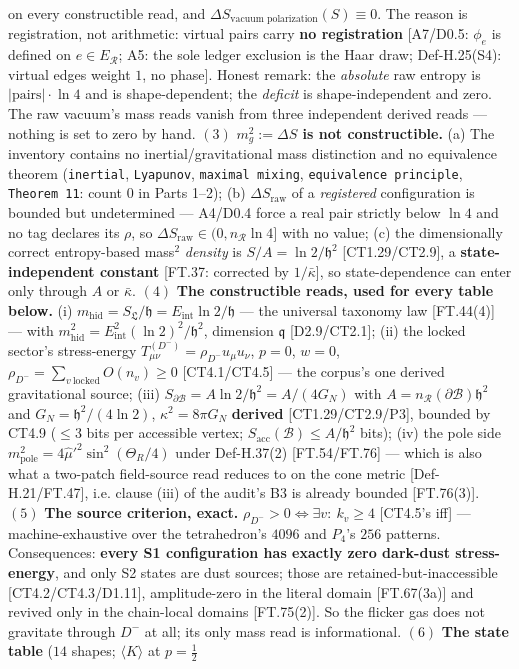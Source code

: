 \begin{theorem}
on every constructible read, and $\Delta S_{\text{vacuum polarization}}(S)\equiv0$. The reason is registration, not arithmetic: virtual pairs carry \textbf{no registration} [A7/D0.5: $\phi_e$ is defined on $e\in E_{\mathcal R}$; A5: the sole ledger exclusion is the Haar draw; Def-H.25(S4): virtual edges weight $1$, no phase]. Honest remark: the \textit{absolute} raw entropy is $|\mathrm{pairs}|\cdot\ln4$ and is shape-dependent; the \textit{deficit} is shape-independent and zero. The raw vacuum's mass reads vanish from three independent derived reads — nothing is set to zero by hand. $(3)$ \textbf{$m_g^2:=\Delta S$ is not constructible.} (a) The inventory contains no inertial/gravitational mass distinction and no equivalence theorem (\texttt{inertial}, \texttt{Lyapunov}, \texttt{maximal\ mixing}, \texttt{equivalence\ principle}, \texttt{Theorem\ 11}: count $0$ in Parts 1–2); (b) $\Delta S_{\mathrm{raw}}$ of a \textit{registered} configuration is bounded but undetermined — A4/D0.4 force a real pair strictly below $\ln4$ and no tag declares its $\rho$, so $\Delta S_{\mathrm{raw}}\in(0,n_{\mathcal R}\ln4]$ with no value; (c) the dimensionally correct entropy-based mass$^2$ \textit{density} is $S/A=\ln2/\mathfrak h^2$ [CT1.29/CT2.9], a \textbf{state-independent constant} [FT.37: corrected by $1/\bar\kappa$], so state-dependence can enter only through $A$ or $\bar\kappa$. $(4)$ \textbf{The constructible reads, used for every table below.} (i) $m_{\mathrm{hid}}=S_{\mathfrak L}/\mathfrak h=E_{\mathrm{int}}\ln2/\mathfrak h$ — the universal taxonomy law [FT.44(4)] — with $m_{\mathrm{hid}}^2=E_{\mathrm{int}}^2(\ln2)^2/\mathfrak h^2$, dimension $\mathfrak q$ [D2.9/CT2.1]; (ii) the locked sector's stress-energy $T^{(D^-)}_{\mu\nu}=\rho_{D^-}u_\mu u_\nu$, $p=0$, $w=0$, $\rho_{D^-}=\sum_{v\ \mathrm{locked}}O(n_v)\ge0$ [CT4.1/CT4.5] — the corpus's one derived gravitational source; (iii) $S_{\partial\mathcal B}=A\ln2/\mathfrak h^2=A/(4G_N)$ with $A=n_{\mathcal R}(\partial\mathcal B)\mathfrak h^2$ and $G_N=\mathfrak h^2/(4\ln2)$, $\kappa^2=8\pi G_N$ \textbf{derived} [CT1.29/CT2.9/P3], bounded by CT4.9 ($\le3$ bits per accessible vertex; $S_{\mathrm{acc}}(\mathcal B)\le A/\mathfrak h^2$ bits); (iv) the pole side $m^2_{\mathrm{pole}}=4\hat\mu'^2\sin^2(\Theta_R/4)$ under Def-H.37(2) [FT.54/FT.76] — which is also what a two-patch field-source read reduces to on the cone metric [Def-H.21/FT.47], i.e. clause (iii) of the audit's B3 is already bounded [FT.76(3)]. $(5)$ \textbf{The source criterion, exact.} $\rho_{D^-}>0\iff\exists v:\ k_v\ge4$ [CT4.5's iff] — machine-exhaustive over the tetrahedron's $4096$ and $P_4$'s $256$ patterns. Consequences: \textbf{every S1 configuration has exactly zero dark-dust stress-energy}, and only S2 states are dust sources; those are retained-but-inaccessible [CT4.2/CT4.3/D1.11], amplitude-zero in the literal domain [FT.67(3a)] and revived only in the chain-local domains [FT.75(2)]. So the flicker gas does not gravitate through $D^-$ at all; its only mass read is informational. $(6)$ \textbf{The state table} ($14$ shapes; $\langle K\rangle$ at $p=\tfrac12$ 
\end{theorem}
